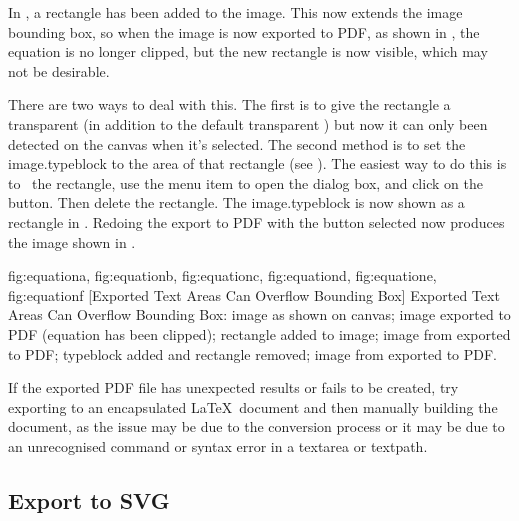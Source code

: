 In , a rectangle has been
added to the image. This now extends the image bounding box, so when
the image is now exported to PDF, as shown in
, the equation is no longer clipped,
but the new rectangle is now visible, which may not be desirable.

There are two ways to deal with this. The first is to give the
rectangle a \gls{transparent}  (in addition to the
default \gls{transparent} ) but now it can only been detected on the
\gls{canvas} when it's selected. The second method is to set the
\gls{image.typeblock} to the area of that rectangle (see ).
The easiest way to do this is to \select\ the rectangle, use the
 menu item to open the
 dialog box, and click on the
 button. Then delete the
rectangle. The \gls{image.typeblock} is now shown as a  rectangle in
. Redoing the export to PDF with the
 button selected now
produces the image shown in .

{
 {fig:equationa}{}{},
 {fig:equationb}{}{},
 {fig:equationc}{}{},
 {fig:equationd}{}{},
 {fig:equatione}{}{},
 {fig:equationf}{}{}
}
[Exported Text Areas Can Overflow Bounding Box]
{Exported Text Areas Can Overflow Bounding Box:
 image as shown on canvas;
 image exported to PDF (equation has been clipped);
 rectangle added to image;
 image from  exported to PDF;
 typeblock added and rectangle removed;
 image from  exported to PDF.}

If the exported PDF file has unexpected results or fails to be
created, try exporting to an encapsulated \LaTeX\ document and then
manually building the document, as the issue may be due to the
conversion process or it may be due to an unrecognised command or
syntax error in a \gls{textarea} or \gls{textpath}.


\subsection{Export to SVG}\label{sec:exportsvg}


